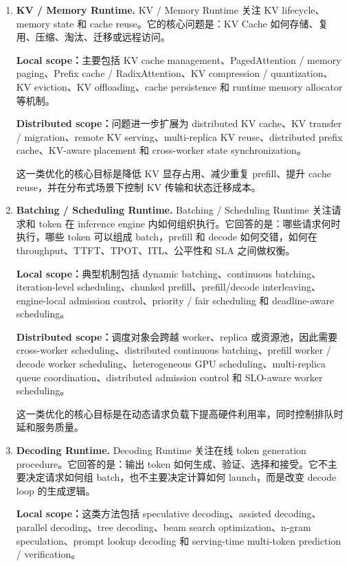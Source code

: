 \begin{enumerate}
    \item \textbf{KV / Memory Runtime.} KV / Memory Runtime 关注 KV lifecycle、memory state 和 cache reuse。它的核心问题是：KV Cache 如何存储、复用、压缩、淘汰、迁移或远程访问。

    \textbf{Local scope：}主要包括 KV cache management、PagedAttention / memory paging、Prefix cache / RadixAttention、KV compression / quantization、KV eviction、KV offloading、cache persistence 和 runtime memory allocator 等机制。

    \textbf{Distributed scope：}问题进一步扩展为 distributed KV cache、KV transfer / migration、remote KV serving、multi-replica KV reuse、distributed prefix cache、KV-aware placement 和 cross-worker state synchronization。

    这一类优化的核心目标是降低 KV 显存占用、减少重复 prefill、提升 cache reuse，并在分布式场景下控制 KV 传输和状态迁移成本。

    \item \textbf{Batching / Scheduling Runtime.} Batching / Scheduling Runtime 关注请求和 token 在 inference engine 内如何组织执行。它回答的是：哪些请求何时执行，哪些 token 可以组成 batch，prefill 和 decode 如何交错，如何在 throughput、TTFT、TPOT、ITL、公平性和 SLA 之间做权衡。

    \textbf{Local scope：}典型机制包括 dynamic batching、continuous batching、iteration-level scheduling、chunked prefill、prefill/decode interleaving、engine-local admission control、priority / fair scheduling 和 deadline-aware scheduling。

    \textbf{Distributed scope：}调度对象会跨越 worker、replica 或资源池，因此需要 cross-worker scheduling、distributed continuous batching、prefill worker / decode worker scheduling、heterogeneous GPU scheduling、multi-replica queue coordination、distributed admission control 和 SLO-aware worker scheduling。

    这一类优化的核心目标是在动态请求负载下提高硬件利用率，同时控制排队时延和服务质量。

    \item \textbf{Decoding Runtime.} Decoding Runtime 关注在线 token generation procedure。它回答的是：输出 token 如何生成、验证、选择和接受。它不主要决定请求如何组 batch，也不主要决定计算如何 launch，而是改变 decode loop 的生成逻辑。

    \textbf{Local scope：}这类方法包括 speculative decoding、assisted decoding、parallel decoding、tree decoding、beam search optimization、n-gram speculation、prompt lookup decoding 和 serving-time multi-token prediction / verification。


\end{enumerate}
